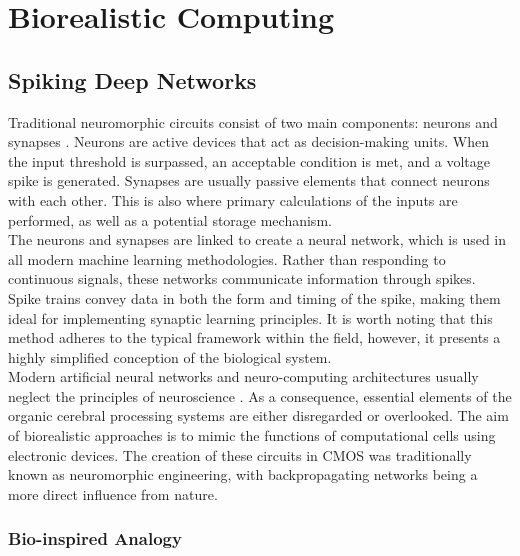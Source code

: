 
\chapter{Biorealistic Computing}

\section[Spiking Deep Networks]{Spiking Deep Networks}

Traditional neuromorphic circuits consist of two main components: neurons and synapses \cite{mead1989analog}. Neurons are active devices that act as decision-making units. When the input threshold is surpassed, an acceptable condition is met, and a voltage spike is generated. Synapses are usually passive elements that connect neurons with each other. This is also where primary calculations of the inputs are performed, as well as a potential storage mechanism.\\

\noindent The neurons and synapses are linked to create a neural network, which is used in all modern machine learning methodologies. Rather than responding to continuous signals, these networks communicate information through spikes. Spike trains convey data in both the form and timing of the spike, making them ideal for implementing synaptic learning principles. It is worth noting that this method adheres to the typical framework within the field, however, it presents a highly simplified conception of the biological system.\\

\noindent Modern artificial neural networks and neuro-computing architectures usually neglect the principles of neuroscience \cite{pfeiffer2018deep}. As a consequence, essential elements of the organic cerebral processing systems are either disregarded or overlooked. The aim of biorealistic approaches is to mimic the functions of computational cells using electronic devices. The creation of these circuits in CMOS was traditionally known as neuromorphic engineering, with backpropagating networks being a more direct influence from nature.

\subsection[Bio-inspired Analogy]{Bio-inspired Analogy}

